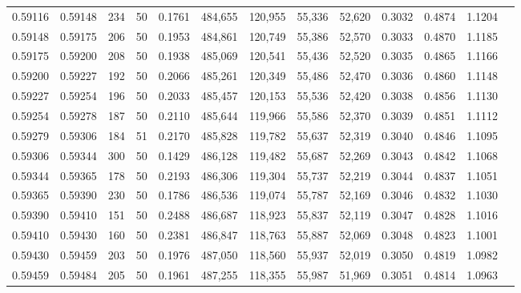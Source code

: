 \begin{tabular}{rrrrrrrrrrrrr}
0.59116 & 0.59148 &   234 &  50 &                                     0.1761 & 484,655 & 120,955 &  55,336 &  52,620 & 0.3032 & 0.4874 & 1.1204 \\
0.59148 & 0.59175 &   206 &  50 &                                     0.1953 & 484,861 & 120,749 &  55,386 &  52,570 & 0.3033 & 0.4870 & 1.1185 \\
0.59175 & 0.59200 &   208 &  50 &                                     0.1938 & 485,069 & 120,541 &  55,436 &  52,520 & 0.3035 & 0.4865 & 1.1166 \\
0.59200 & 0.59227 &   192 &  50 &                                     0.2066 & 485,261 & 120,349 &  55,486 &  52,470 & 0.3036 & 0.4860 & 1.1148 \\
0.59227 & 0.59254 &   196 &  50 &                                     0.2033 & 485,457 & 120,153 &  55,536 &  52,420 & 0.3038 & 0.4856 & 1.1130 \\
0.59254 & 0.59278 &   187 &  50 &                                     0.2110 & 485,644 & 119,966 &  55,586 &  52,370 & 0.3039 & 0.4851 & 1.1112 \\
0.59279 & 0.59306 &   184 &  51 &                                     0.2170 & 485,828 & 119,782 &  55,637 &  52,319 & 0.3040 & 0.4846 & 1.1095 \\
0.59306 & 0.59344 &   300 &  50 &                                     0.1429 & 486,128 & 119,482 &  55,687 &  52,269 & 0.3043 & 0.4842 & 1.1068 \\
0.59344 & 0.59365 &   178 &  50 &                                     0.2193 & 486,306 & 119,304 &  55,737 &  52,219 & 0.3044 & 0.4837 & 1.1051 \\
0.59365 & 0.59390 &   230 &  50 &                                     0.1786 & 486,536 & 119,074 &  55,787 &  52,169 & 0.3046 & 0.4832 & 1.1030 \\
0.59390 & 0.59410 &   151 &  50 &                                     0.2488 & 486,687 & 118,923 &  55,837 &  52,119 & 0.3047 & 0.4828 & 1.1016 \\
0.59410 & 0.59430 &   160 &  50 &                                     0.2381 & 486,847 & 118,763 &  55,887 &  52,069 & 0.3048 & 0.4823 & 1.1001 \\
0.59430 & 0.59459 &   203 &  50 &                                     0.1976 & 487,050 & 118,560 &  55,937 &  52,019 & 0.3050 & 0.4819 & 1.0982 \\
0.59459 & 0.59484 &   205 &  50 &                                     0.1961 & 487,255 & 118,355 &  55,987 &  51,969 & 0.3051 & 0.4814 & 1.0963 \\

\end{tabular}
